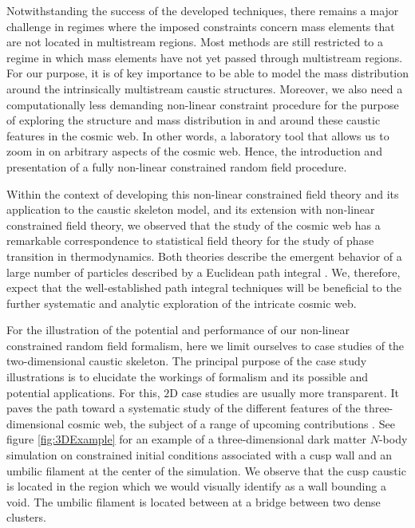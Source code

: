 \documentclass[a4paper, 11pt]{article}
\begin{document}
\bigskip
Notwithstanding the success of the developed techniques, there remains a major challenge in regimes where the imposed constraints concern mass elements that are not located in multistream regions. Most methods are still restricted to a regime in which mass elements have not yet passed through multistream regions. For our purpose, it is of key importance to be able to model the mass distribution around the intrinsically multistream caustic structures. Moreover, we also need a computationally less demanding non-linear constraint procedure for the purpose of exploring the structure and mass distribution in and around these caustic features in the cosmic web. In other words, a laboratory tool that allows us to zoom in on arbitrary aspects of the cosmic web. Hence, the introduction and presentation of a fully non-linear constrained random field procedure. 

Within the context of developing this non-linear constrained field theory and its application to the caustic skeleton model, and its extension with non-linear constrained field theory, we observed that the study of the cosmic web has a remarkable correspondence to statistical field theory for the study of phase transition in thermodynamics. Both theories describe the emergent behavior of a large number of particles described by a Euclidean path integral \cite{Feynman:1965}. We, therefore, expect that the well-established path integral techniques will be beneficial to the further systematic and analytic exploration of the intricate cosmic web.

\bigskip
For the illustration of the potential and performance of our non-linear constrained random field formalism, here we limit ourselves to case studies of the two-dimensional caustic skeleton. The principal purpose of the case study illustrations is to elucidate the workings of formalism and its possible and potential applications. For this, $2$D case studies are usually more transparent. It paves the path toward a systematic study of the different features of the three-dimensional cosmic web, the subject of a range of upcoming contributions \cite{Feldbrugge:2022}. See figure \ref{fig:3DExample} for an example of a three-dimensional dark matter $N$-body simulation on constrained initial conditions associated with a cusp wall and an umbilic filament at the center of the simulation. We observe that the cusp caustic is located in the region which we would visually identify as a wall bounding a void. The umbilic filament is located between at a bridge between two dense clusters.
\end{document}
